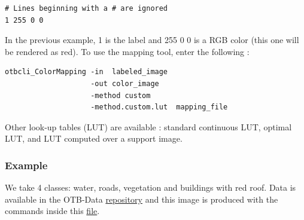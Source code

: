 \begin{verbatim}
# Lines beginning with a # are ignored
1 255 0 0
\end{verbatim}

In the previous example, 1 is the label and 255 0 0 is a RGB color
(this one will be rendered as red). To use the mapping tool, enter
the following :

\begin{verbatim}
otbcli_ColorMapping -in  labeled_image
                    -out color_image
                    -method custom
                    -method.custom.lut  mapping_file
\end{verbatim}

Other look-up tables (LUT) are available : standard continuous LUT,
optimal LUT, and LUT computed over a support image.

\subsubsection{Example}
We take 4 classes: water, roads, vegetation and buildings with red roof.
Data is available in the OTB-Data
\href{http://hg.orfeo-toolbox.org/OTB-Data/file/0fed8f4f035c/Input/Classification}{repository}
and this image is produced with the commands inside this
\href{http://hg.orfeo-toolbox.org/OTB-Applications/file/3ce975605013/Testing/Classification/CMakeLists.txt}{file}.

